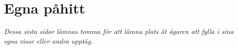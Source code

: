 
\section{Egna påhitt}

\pagestyle{Egna påhitt}



\emph{Dessa sista sidor lämnas tomma för att lämna plats åt ägaren att fylla i sina egna visor eller andra upptåg.}

\newpage
 \phantom{1}
\newpage
 \phantom{1}
\newpage
 \phantom{1}
\newpage
 \phantom{1}
\newpage
 \phantom{1}
\newpage
 \phantom{1}
\newpage
 \phantom{1}
\newpage